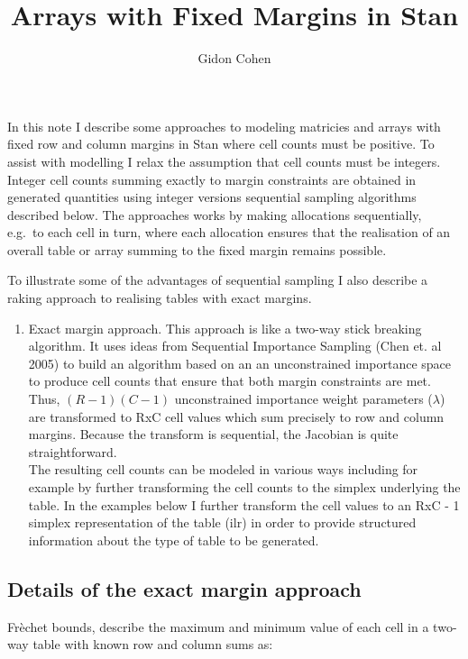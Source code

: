 \documentclass[
  letterpaper,
  DIV=11,
  numbers=noendperiod]{scrartcl}
\title{Arrays with Fixed Margins in Stan}
\author{Gidon Cohen}
\date{}
\providecommand{\tightlist}{%
  \setlength{\itemsep}{0pt}\setlength{\parskip}{0pt}}
\begin{document}
\maketitle


In this note I describe some approaches to modeling matricies and arrays
with fixed row and column margins in Stan where cell counts must be
positive. To assist with modelling I relax the assumption that cell
counts must be integers. Integer cell counts summing exactly to margin
constraints are obtained in generated quantities using integer versions
sequential sampling algorithms described below. The approaches works by
making allocations sequentially, e.g.~to each cell in turn, where each
allocation ensures that the realisation of an overall table or array
summing to the fixed margin remains possible.

To illustrate some of the advantages of sequential sampling I also
describe a raking approach to realising tables with exact margins.

\begin{enumerate}
\def\labelenumi{\arabic{enumi}.}
\tightlist
\item
  Exact margin approach. This approach is like a two-way stick breaking
  algorithm. It uses ideas from Sequential Importance Sampling (Chen et.
  al 2005) to build an algorithm based on an an unconstrained importance
  space to produce cell counts that ensure that both margin constraints
  are met. Thus, \((R - 1)(C - 1)\) unconstrained importance weight
  parameters (\(\lambda\)) are transformed to RxC cell values which sum
  precisely to row and column margins. Because the transform is
  sequential, the Jacobian is quite straightforward.\\
  The resulting cell counts can be modeled in various ways including for
  example by further transforming the cell counts to the simplex
  underlying the table. In the examples below I further transform the
  cell values to an RxC - 1 simplex representation of the table
  (\(\text{ilr}\)) in order to provide structured information about the
  type of table to be generated.
\end{enumerate}

\subsection{Details of the exact margin
approach}\label{details-of-the-exact-margin-approach}

Frèchet bounds, describe the maximum and minimum value of each cell in a
two-way table with known row and column sums as:
\end{document}
